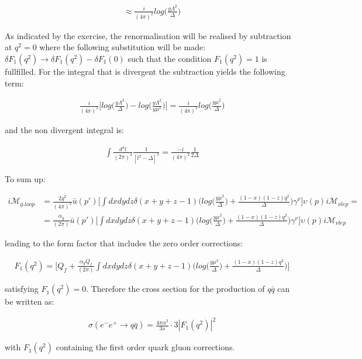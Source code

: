 \documentclass[a4paper,10pt]{article}
\begin{document}
 \begin{align*}
  \approx \frac{i}{(4\pi)^{2}}log\Big(\frac{y\Lambda^{2}}{\Delta}\Big)
 \end{align*}

 As indicated by the exercise, the renormalisation will be realised by subtraction at $q^{2}=0$ where the following 
 substitution will be made: \\ $\delta F_{1}(q^{2})\rightarrow \delta F_{1}(q^{2})-\delta F_{1}(0)$ such that the 
 condition $F_{1}(q^{2})=1$ is fullfilled. For the integral that is divergent the subtraction yields the following 
 term:
 
 \begin{align*}
 \frac{i}{(4\pi)^{2}}\Bigg[log\Big(\frac{y\Lambda^{2}}{\Delta}\Big)-log\Big(\frac{y\Lambda^{2}}{y\mu^{2}}\Big)\Bigg]=\frac{i}{(4\pi)^{2}}log\Big(\frac{y\mu^{2}}{\Delta}\Big) 
 \end{align*}

 and the non divergent integral is:
 
 \begin{align*}
  \int \frac{d^{4}l}{(2\pi)^{4}}\frac{1}{[l^{2}-\Delta]^{3}}=\frac{-i}{(4\pi)^{2}}\frac{1}{2\Delta}
 \end{align*}

 To sum up:
 
 \begin{align*}
  i\mathcal{M}_{g.loop} &=\frac{2g^{2}}{(4\pi)^{2}}\bar{u}(p')\Bigg[\int dxdydz \delta(x+y+z-1)\bigg(log\Big(\frac{y\mu^{2}}{\Delta}\Big)+\frac{(1-x)(1-z)q^{2}}{\Delta}\bigg)\gamma^{\nu}\Bigg]\upsilon(p) i\mathcal{M}_{\nu lep}=\\
			&=\frac{\alpha_{g}}{(2\pi)}\bar{u}(p')\Bigg[\int dxdydz \delta(x+y+z-1)\bigg(log\Big(\frac{y\mu^{2}}{\Delta}\Big)+\frac{(1-x)(1-z)q^{2}}{\Delta}\bigg)\gamma^{\nu}\Bigg]\upsilon(p) i\mathcal{M}_{\nu lep}
 \end{align*}

 leading to the form factor that includes the zero order corrections:
 
 \begin{align*}
  F_{1}(q^{2})=\Bigg[Q_{f}+\frac{\alpha_{g}Q_{f}}{(2\pi)}\int dxdydz \delta(x+y+z-1)\bigg(log\Big(\frac{y\mu^{2}}{\Delta}\Big)+\frac{(1-x)(1-z)q^{2}}{\Delta}\bigg)\Bigg]
 \end{align*}

 satisfying $F_{1}(q^{2})=0$. Therefore the cross section for the production of $q\bar{q}$ can be written as:
 
 \begin{align*}
  \sigma (e^{-}e^{+}\rightarrow q\bar{q})= \frac{4\pi\alpha^{2}}{3s}\cdot 3\left| F_{1}(q^{2})\right| ^{2}
 \end{align*}

 with $F_{1}(q^{2})$ containing the first order quark gluon corrections. 
\end{document}
